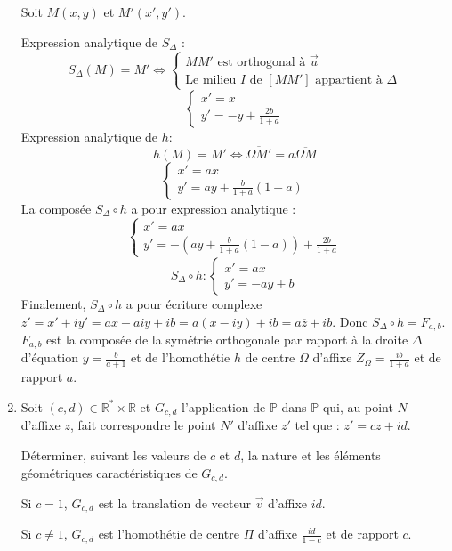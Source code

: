\documentclass[12pt,a4paper]{article}
\begin{document}
\begin{enumerate}
Soit $M(x, y)$ et $M'(x', y')$.

Expression analytique de $S_\Delta$ :
\[ S_\Delta(M) = M' \Leftrightarrow
\begin{cases} 
MM' \text{ est orthogonal à } \vec{u} \\ 
\text{Le milieu } I \text{ de } [MM'] \text{ appartient à } \Delta 
\end{cases} \]
\[
\begin{cases}
x' = x \\ 
y' = -y + \frac{2b}{1 + a}
\end{cases} \]
Expression analytique de $h$:
\[ h(M) = M' \Leftrightarrow \overline{\Omega M'} = a \overline{\Omega M} \]
\[
\begin{cases} 
x' = a x \\ 
y' = a y + \frac{b}{1 + a}(1 - a)
\end{cases} \]
La composée $S_\Delta \circ h$ a pour expression analytique :
\[
\begin{cases} 
x' = a x \\ 
y' = -\left(a y + \frac{b}{1 + a}(1 - a)\right) + \frac{2b}{1 + a}
\end{cases} \]
\[ S_\Delta \circ h : 
\begin{cases} 
x' = a x \\ 
y' = -a y + b
\end{cases} \]
Finalement, $S_\Delta \circ h$ a pour écriture complexe $z' = x' + i y' = a x - a i y + i b = a(x - i y) + i b = a \overline{z} + i b$. Donc $S_\Delta \circ h = F_{a,b}$.
$F_{a,b}$ est la composée de la symétrie orthogonale par rapport à la droite $\Delta$ d’équation $y = \frac{b}{a + 1}$ et de l’homothétie $h$ de centre $\Omega$ d’affixe $Z_\Omega = \frac{i b}{1 + a}$ et de rapport $a$.
\item Soit $(c, d) \in \mathbb{R}^* \times \mathbb{R}$ et $G_{c,d}$ l’application de $\mathbb{P}$ dans $\mathbb{P}$ qui, au point $N$ d’affixe $z$, fait correspondre le point $N'$ d’affixe $z'$ tel que : $z' = c z + i d$.

Déterminer, suivant les valeurs de $c$ et $d$, la nature et les éléments géométriques caractéristiques de $G_{c,d}$.

     Si $c = 1$, $G_{c,d}$ est la translation de vecteur $\vec{v}$ d’affixe $i d$.
     
     Si $c \neq 1$, $G_{c,d}$ est l’homothétie de centre $\Pi$ d’affixe $\frac{i d}{1 - c}$ et de rapport $c$.

\end{enumerate}
\end{document}
